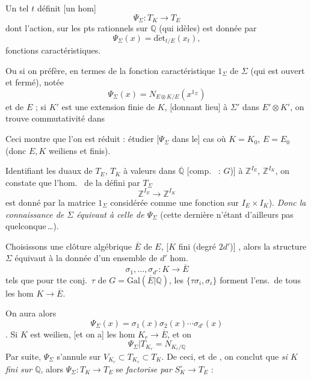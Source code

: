 \documentclass[11pt,a4paper]{article}
\begin{document}
Un tel $t$ définit [un hom]
\[
  \Psi_{\Sigma} : T_{K} \longrightarrow T_{E}
\]
dont l'action, sur les pts rationnels sur $\mathbb{Q}$ (qui \ill{} \ill{}
idèles) est donnée par
\[
  \Psi_{\Sigma}(x) = \mathrm{d\acute{e}t}_{t/E}(x_{t}) ,
\]
\ill{} fonctions caractéristiques.

Ou si on préfère, en termes de la fonction caractéristique \struck{\ill{}}
$1_{\Sigma}$ de $\Sigma$ (qui est ouvert et fermé), notée
\[
  \Psi_{\Sigma}(x) = N_{E \otimes K/E}(x^{1_{\Sigma}})
\]
et \ill{} de $E$ ; si $K'$ est une extension finie de $K$, [donnant lieu] à
$\Sigma'$ dans $E' \otimes K'$, on trouve commutativité dans


Ceci montre que l'on est réduit : étudier [$\Psi_{\Sigma}$ dans le] cas où
$K = K_{0}$, $E = E_{0}$ (donc $E, K$ weiliens et finis).

Identifiant \struck{\ill{}} les duaux de $T_{E}$, $T_{K}$ à valeurs dans
$\overline{\mathbb{Q}}$ [comp.\ \ill{} : $G$)] à $\mathbb{Z}^{I_{E}}$,
$\mathbb{Z}^{I_{K}}$, on constate que l'hom.\ \ill{} \struck{\ill{}} \ill{} de
la  défini par $T_{\Sigma}$
\[
  \mathbb{Z}^{I_{E}} \longrightarrow \mathbb{Z}^{I_{K}}
\]
est donné par la matrice $1_{\Sigma}$ considérée comme une fonction
 sur $I_{E} \times I_{K}$). \emph{Donc la
connaissance de $\Sigma$ équivaut à celle de $\Psi_{\Sigma}$} (cette dernière
n'étant d'ailleurs pas quelconque\,…).

Choisissons une clôture algébrique $\overline{E}$ de $E$, 
[$K$ fini (degré $2d'$)] , alors la structure
$\Sigma$ équivaut à la donnée d'un ensemble de $d'$ hom.
\[
  \sigma_{1}, \ldots, \sigma_{d'} : K \longrightarrow \overline{E}
\]
tels que pour tte conj.\ $\tau$ de $G = \mathrm{Gal}(\overline{E} |
\mathbb{Q})$, \struck{\ill{}} les $\{\tau\sigma_{i}, \sigma_{i}\}$ forment
l'ens.\ de tous les hom $K \to \overline{E}$.

On aura alors
\[
  \Psi_{\Sigma}(x) = \sigma_{1}(x)\sigma_{2}(x) \cdots \sigma_{d'}(x)
\]
.
Si $K$ est weilien, \struck{\ill{}} [et on a] les hom $K_{r} \to
\overline{E}$, et on \ill{} 
\[
  \Psi_{\Sigma} | T_{K_{r}} = N_{K_{r}/\mathbb{Q}}
\]
Par suite, $\Psi_{\Sigma}$ s'annule sur $V_{K_{r}} \subset T_{K_{r}} \subset
T_{K}$. De ceci, et de \ill{}, on conclut que \emph{si $K$ fini sur
$\mathbb{Q}$}, alors $\Psi_{\Sigma} : T_{K} \to T_{E}$ se \emph{factorise
par} $S^{\circ}_{K} \to T_{E}$ :
\end{document}
